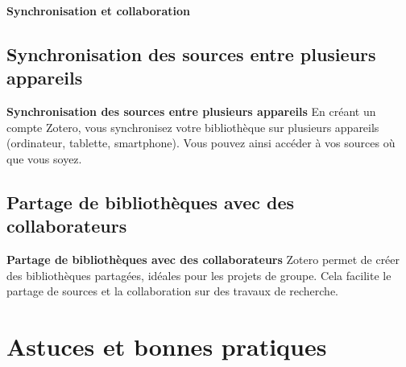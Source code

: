 \documentclass{beamer}
\begin{document}
\begin{frame}{\textbf{Synchronisation et collaboration}}
	
	
\subsection{Synchronisation des sources entre plusieurs appareils}
	
\begin{block}{\textbf{Synchronisation des sources entre plusieurs appareils}}
En créant un compte Zotero, vous synchronisez votre bibliothèque sur plusieurs appareils (ordinateur, tablette, smartphone). Vous pouvez ainsi accéder à vos sources où que vous soyez.
\end{block}

\subsection{Partage de bibliothèques avec des collaborateurs}

\begin{block}{\textbf{Partage de bibliothèques avec des collaborateurs}}
Zotero permet de créer des bibliothèques partagées, idéales pour les projets de groupe. Cela facilite le partage de sources et la collaboration sur des travaux de recherche.
\end{block}

\end{frame}


\section{Astuces et bonnes pratiques}
\end{document}
